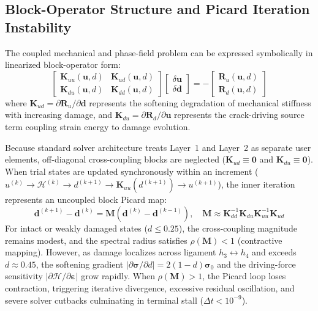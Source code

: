 \subsection{Block-Operator Structure and Picard Iteration Instability}
\label{subsec:f1721_block_operator}

The coupled mechanical and phase-field problem can be expressed symbolically in linearized block-operator form:
\begin{equation}
  \begin{bmatrix}
    \mathbf{K}_{uu}(\mathbf{u}, d) & \mathbf{K}_{ud}(\mathbf{u}, d) \\
    \mathbf{K}_{du}(\mathbf{u}, d) & \mathbf{K}_{dd}(\mathbf{u}, d)
  \end{bmatrix}
  \begin{bmatrix}
    \delta \mathbf{u} \\
    \delta \mathbf{d}
  \end{bmatrix}
  = -
  \begin{bmatrix}
    \mathbf{R}_u(\mathbf{u}, d) \\
    \mathbf{R}_d(\mathbf{u}, d)
  \end{bmatrix}
  \label{eq:coupled_block_system}
\end{equation}
where $\mathbf{K}_{ud} = \partial \mathbf{R}_u / \partial \mathbf{d}$ represents the softening degradation of mechanical stiffness with increasing damage, and $\mathbf{K}_{du} = \partial \mathbf{R}_d / \partial \mathbf{u}$ represents the crack-driving source term coupling strain energy to damage evolution.

Because standard \Abaqus solver architecture treats Layer~1 and Layer~2 as separate user elements, off-diagonal cross-coupling blocks are neglected ($\mathbf{K}_{ud} \equiv \mathbf{0}$ and $\mathbf{K}_{du} \equiv \mathbf{0}$). When trial states are updated synchronously within an increment ($u^{(k)} \to \mathcal{H}^{(k)} \to d^{(k+1)} \to \mathbf{K}_{uu}(d^{(k+1)}) \to u^{(k+1)}$), the inner iteration represents an uncoupled block Picard map:
\begin{equation}
  \mathbf{d}^{(k+1)} - \mathbf{d}^{(k)} = \mathbf{M} \left( \mathbf{d}^{(k)} - \mathbf{d}^{(k-1)} \right), \quad \mathbf{M} \approx \mathbf{K}_{dd}^{-1} \mathbf{K}_{du} \mathbf{K}_{uu}^{-1} \mathbf{K}_{ud}
  \label{eq:picard_operator}
\end{equation}
For intact or weakly damaged states ($d \le 0.25$), the cross-coupling magnitude remains modest, and the spectral radius satisfies $\rho(\mathbf{M}) < 1$ (contractive mapping). However, as damage localizes across ligament $h_3 \leftrightarrow h_4$ and exceeds $d \approx 0.45$, the softening gradient $|\partial \boldsymbol{\sigma}/\partial d| = 2(1-d)\boldsymbol{\sigma}_0$ and the driving-force sensitivity $|\partial \mathcal{H}/\partial \boldsymbol{\varepsilon}|$ grow rapidly. When $\rho(\mathbf{M}) > 1$, the Picard loop loses contraction, triggering iterative divergence, excessive residual oscillation, and severe solver cutbacks culminating in terminal stall ($\Delta t < 10^{-9}$).

